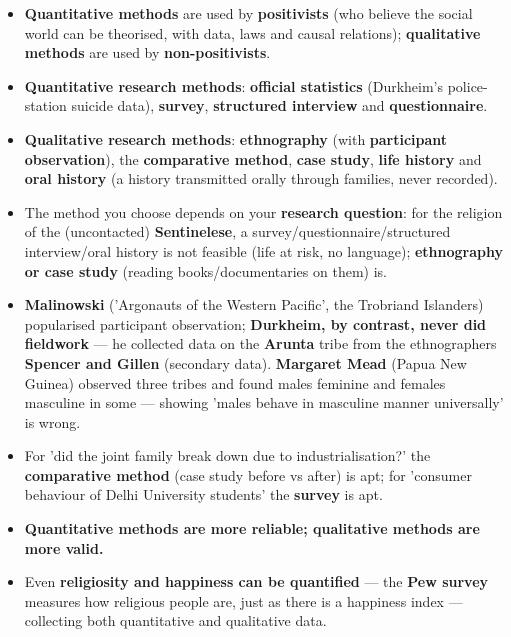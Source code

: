 \begin{KeyConcept}
\begin{itemize}
\item \textbf{Quantitative methods} are used by \textbf{positivists} (who believe the social world can be theorised, with data, laws and causal relations); \textbf{qualitative methods} are used by \textbf{non-positivists}.
\item \textbf{Quantitative research methods}: \textbf{official statistics} (Durkheim's police-station suicide data), \textbf{survey}, \textbf{structured interview} and \textbf{questionnaire}.
\item \textbf{Qualitative research methods}: \textbf{ethnography} (with \textbf{participant observation}), the \textbf{comparative method}, \textbf{case study}, \textbf{life history} and \textbf{oral history} (a history transmitted orally through families, never recorded).
\item The method you choose depends on your \textbf{research question}: for the religion of the (uncontacted) \textbf{Sentinelese}, a survey/questionnaire/structured interview/oral history is not feasible (life at risk, no language); \textbf{ethnography or case study} (reading books/documentaries on them) is.
\item \textbf{Malinowski} ('Argonauts of the Western Pacific', the Trobriand Islanders) popularised participant observation; \textbf{Durkheim, by contrast, never did fieldwork} --- he collected data on the \textbf{Arunta} tribe from the ethnographers \textbf{Spencer and Gillen} (secondary data). \textbf{Margaret Mead} (Papua New Guinea) observed three tribes and found males feminine and females masculine in some --- showing 'males behave in masculine manner universally' is wrong.
\item For 'did the joint family break down due to industrialisation?' the \textbf{comparative method} (case study before vs after) is apt; for 'consumer behaviour of Delhi University students' the \textbf{survey} is apt.
\item \textbf{Quantitative methods are more reliable; qualitative methods are more valid.}
\item Even \textbf{religiosity and happiness can be quantified} --- the \textbf{Pew survey} measures how religious people are, just as there is a happiness index --- collecting both quantitative and qualitative data.
\end{itemize}
\end{KeyConcept}

